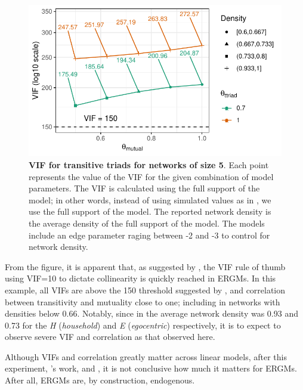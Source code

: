 \documentclass[12pt]{article}
\begin{document}
\begin{figure}
  \centering
  \includegraphics[width = .7\linewidth]{vif-n=5.pdf}
  \caption[]{\textbf{VIF for transitive triads for networks of size 5}. Each point represents the value of the VIF for the given combination of model parameters. The VIF is calculated using the full support of the model; in other words, instead of using simulated values as in \cite{duxburyDiagnosingMulticollinearityExponential2021}, we use the full support of the model. The reported network density is the average density of the full support of the model. The models include an edge parameter raging between -2 and -3 to control for network density.} 
  \label{fig:vif-ttriad}
\end{figure}

From the figure, it is apparent that, as suggested by \citeauthor{duxburyDiagnosingMulticollinearityExponential2021}, the VIF rule of thumb using VIF=10 to dictate collinearity is quickly reached in ERGMs. In this example, all VIFs are above the 150 threshold suggested by \citeauthor*{duxburyDiagnosingMulticollinearityExponential2021}, and correlation between transitivity and mutuality close to one; including in networks with densities below 0.66. Notably, since in \cite{krivitskyTaleTwoDatasets2022} the average network density was 0.93 and 0.73 for the \textit{H} (\textit{household}) and \textit{E} (\textit{egocentric}) respectively, it is to expect to observe severe VIF and correlation as that observed here.

Although VIFs and correlation greatly matter across linear models, after this experiment, \citeauthor*{duxburyDiagnosingMulticollinearityExponential2021}'s work, and \citeauthor*{krivitskyTaleTwoDatasets2022}, it is not conclusive how much it matters for ERGMs. After all, ERGMs are, by construction, endogenous.


\end{document}
